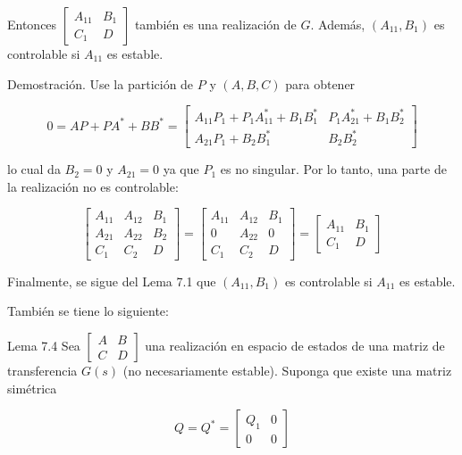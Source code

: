 Entonces $\left[\begin{array}{c|c}A_{11} & B_{1} \\ \hline C_{1} & D\end{array}\right]$ también es una realización de $G$. Además, $\left(A_{11}, B_{1}\right)$ es controlable si $A_{11}$ es estable.

Demostración. Use la partición de $P$ y $(A, B, C)$ para obtener

$$
0=A P+P A^{*}+B B^{*}=\left[\begin{array}{cc}
A_{11} P_{1}+P_{1} A_{11}^{*}+B_{1} B_{1}^{*} & P_{1} A_{21}^{*}+B_{1} B_{2}^{*} \\
A_{21} P_{1}+B_{2} B_{1}^{*} & B_{2} B_{2}^{*}
\end{array}\right]
$$

lo cual da $B_{2}=0$ y $A_{21}=0$ ya que $P_{1}$ es no singular. Por lo tanto, una parte de la realización no es controlable:

$$
\left[\begin{array}{cc|c}
A_{11} & A_{12} & B_{1} \\
A_{21} & A_{22} & B_{2} \\
\hline C_{1} & C_{2} & D
\end{array}\right]=\left[\begin{array}{cc|c}
A_{11} & A_{12} & B_{1} \\
0 & A_{22} & 0 \\
\hline C_{1} & C_{2} & D
\end{array}\right]=\left[\begin{array}{c|c}
A_{11} & B_{1} \\
\hline C_{1} & D
\end{array}\right]
$$

Finalmente, se sigue del Lema 7.1 que $\left(A_{11}, B_{1}\right)$ es controlable si $A_{11}$ es estable.

También se tiene lo siguiente:

Lema 7.4 Sea $\left[\begin{array}{c|c}A & B \\ \hline C & D\end{array}\right]$ una realización en espacio de estados de una matriz de transferencia $G(s)$ (no necesariamente estable). Suponga que existe una matriz simétrica

$$
Q=Q^{*}=\left[\begin{array}{cc}
Q_{1} & 0 \\
0 & 0
\end{array}\right]
$$

